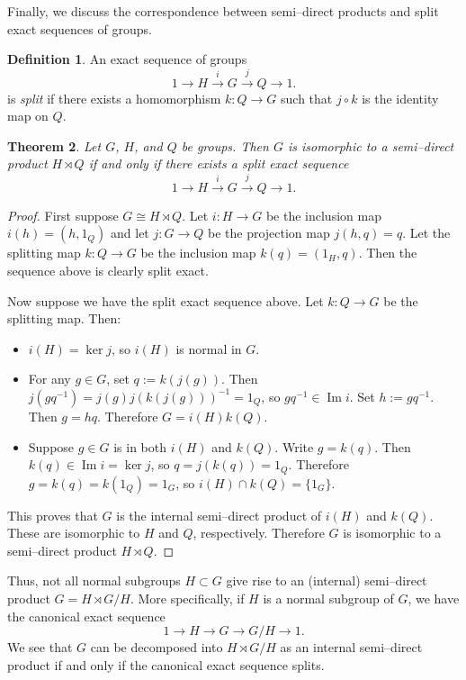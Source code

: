 \documentclass[12pt]{article}
\newcommand{\0}{\bf{0}}
\newcommand{\<}{\langle}
\renewcommand{\>}{\rangle}
\newcommand{\lra}{\longrightarrow}
\newcommand{\iso}{\cong}
\newcommand{\comp}{\circ}
\newcommand{\intersect}{\cap}
\renewcommand{\Im}{\operatorname{Im}}
\newcommand{\semidirect}{\rtimes}
\newtheorem{theorem}{Theorem}
\theoremstyle{definition}
\newtheorem{definition}[theorem]{Definition}
\begin{document}
Finally, we discuss the correspondence between semi--direct products
and split exact sequences of groups.

\begin{definition}
An exact sequence of groups
$$
1 \lra H \stackrel{i}{\lra} G \stackrel{j}{\lra} Q \lra 1.
$$
is {\em split} if there exists a homomorphism $k: Q \lra G$ such that
$j \comp k$ is the identity map on $Q$.
\end{definition}

\begin{theorem}
Let $G$, $H$, and $Q$ be groups. Then $G$ is isomorphic to a
semi--direct product $H \semidirect Q$ if and only if there exists a
split exact sequence
$$
1 \lra H \stackrel{i}{\lra} G \stackrel{j}{\lra} Q \lra 1.
$$
\end{theorem}
\begin{proof}
First suppose $G \iso H \semidirect Q$. Let $i: H \lra G$ be the
inclusion map $i(h) = (h,1_Q)$ and let $j: G \lra Q$ be the
projection map $j(h,q) = q$. Let the splitting map $k: Q \lra G$ be
the inclusion map $k(q) = (1_H,q)$. Then the sequence above is clearly
split exact.

Now suppose we have the split exact sequence above. Let $k: Q \lra G$
be the splitting map. Then:
\begin{itemize}
\item $i(H) = \ker j$, so $i(H)$ is normal in $G$.
\item For any $g \in G$, set $q := k(j(g))$. Then $j(gq^{-1}) = j(g)
j(k(j(g)))^{-1} = 1_Q$, so $gq^{-1} \in \Im i$. Set $h :=
gq^{-1}$. Then $g=hq$. Therefore $G=i(H)k(Q)$.
\item Suppose $g \in G$ is in both $i(H)$ and $k(Q)$. Write $g =
k(q)$. Then $k(q) \in \Im i = \ker j$, so $q = j(k(q)) =
1_Q$. Therefore $g = k(q) = k(1_Q) = 1_G$, so $i(H) \intersect k(Q) =
\{1_G\}$.
\end{itemize}
This proves that $G$ is the internal semi--direct product of $i(H)$
and $k(Q)$. These are isomorphic to $H$ and $Q$,
respectively. Therefore $G$ is isomorphic to a semi--direct product $H
\semidirect Q$.
\end{proof}

Thus, not all normal subgroups $H \subset G$ give rise to an (internal)
semi--direct product $G = H \semidirect G/H$. More specifically, if
$H$ is a normal subgroup of $G$, we have the canonical exact sequence
$$
1 \lra H \lra G \lra G/H \lra 1.
$$
We see that $G$ can be decomposed into $H \semidirect G/H$ as an internal semi--direct product if and only if the canonical exact sequence splits.
\end{document}
